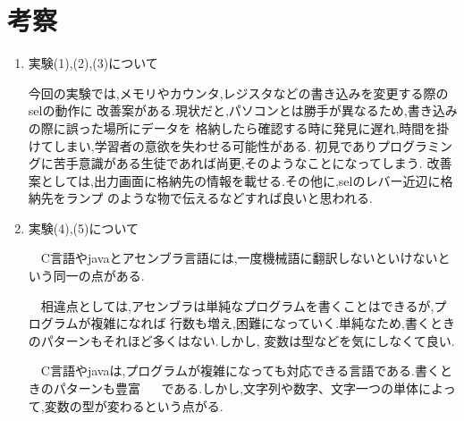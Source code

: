 \documentclass[a4paper,11pt,titlepage]{jarticle}
\begin{document}
 \section{考察}
 \begin{enumerate}
  \item 実験(1),(2),(3)について \par
      今回の実験では,メモリやカウンタ,レジスタなどの書き込みを変更する際のselの動作に
    改善案がある.現状だと,パソコンとは勝手が異なるため,書き込みの際に誤った場所にデータを
    格納したら確認する時に発見に遅れ,時間を掛けてしまい,学習者の意欲を失わせる可能性がある.
    初見でありプログラミングに苦手意識がある生徒であれば尚更,そのようなことになってしまう.
    改善案としては,出力画面に格納先の情報を載せる.その他に,selのレバー近辺に格納先をランプ
    のような物で伝えるなどすれば良いと思われる.
  \item 実験(4),(5)について\par
    　C言語やjavaとアセンブラ言語には,一度機械語に翻訳しないといけないという同一の点がある.\par
  　相違点としては,アセンブラは単純なプログラムを書くことはできるが,プログラムが複雑になれば
    行数も増え,困難になっていく.単純なため,書くときのパターンもそれほど多くはない.しかし,
    変数は型などを気にしなくて良い.\par
    　C言語やjavaは,プログラムが複雑になっても対応できる言語である.書くときのパターンも豊富
　   である.しかし,文字列や数字、文字一つの単体によって,変数の型が変わるという点がる.\par
 \end{enumerate}
\end{document}
